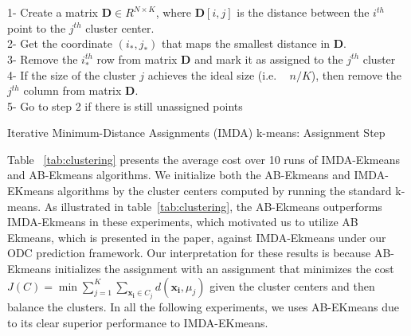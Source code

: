 \begin{algorithm}[b!]
1- Create a matrix $\textbf{D} \in R^{N \times K}$, where $\textbf{D}[i,j]$ is the distance between the $i^{th}$ point to the $j^{th}$ cluster center.\\
2- Get the coordinate $(i_*,j_*)$ that maps the smallest distance in $\textbf{D}$.\\
3- Remove the $i_*^{th}$ row from matrix $\textbf{D}$ and mark it as assigned to the $j^{th}$ cluster\\
4- If the size of the cluster $j$ achieves the ideal size (i.e. ~ $n/K$), then remove the $j^{th}$ column from matrix $\textbf{D}$.\\
5- Go to step 2 if there is still unassigned points
\caption{Iterative Minimum-Distance Assignments (IMDA) k-means: Assignment Step}
\label{alg:ddclusterALg2}
\end{algorithm}





Table ~\ref{tab:clustering} presents the average cost over 10 runs of IMDA-Ekmeans and AB-Ekmeans algorithms. We initialize both the AB-Ekmeans and  IMDA-EKmeans algorithms by the cluster centers computed by running the standard k-means. As illustrated in table~\ref{tab:clustering}, the AB-Ekmeans  outperforms IMDA-Ekmeans in these experiments, which motivated us to utilize AB Ekmeans, which is presented in the paper, against  IMDA-Ekmeans under our ODC prediction framework.  Our interpretation for these results is because AB-Ekmeans initializes the assignment with an assignment that minimizes  the cost $J(C) = \min \sum_{j=1}^K \sum_{\mathbf{x_i}\in C_j} d(\mathbf{x_i}, \mu_j)$ given the cluster centers and then balance the clusters.  In all the following experiments, we uses AB-EKmeans due to its clear superior performance to IMDA-EKmeans. 


